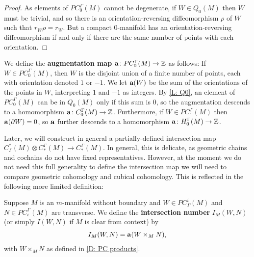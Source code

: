 \begin{proof}
	As elements of $PC_0^\Gamma(M)$ cannot be degenerate, if $W \in Q_0(M)$ then $W$ must be trivial, and so there is an orientation-reversing diffeomorphism $\rho$ of $W$ such that $r_W\rho = r_W$.
	But a compact $0$-manifold has an orientation-reversing diffeomorphism if and only if there are the same number of points with each orientation.
\end{proof}

\begin{definition}\label{D: aug}
	We define the \textbf{augmentation map} $\mathbf{a} \colon PC^\Gamma_0(M) \to \mathbb{Z}$ as follows: If $W \in PC^\Gamma_0(M)$, then $W$ is the disjoint union of a finite number of points, each with orientation denoted $1$ or $-1$.
	We let $\mathbf{a}(W)$ be the sum of the orientations of the points in $W$, interpreting $1$ and $-1$ as integers.
	By \cref{L: Q0}, an element of $PC^\Gamma_0(M)$ can be in $Q_0(M)$ only if this sum is $0$, so the augmentation descends to a homomorphism $\mathbf{a} \colon C^\Gamma_0(M) \to \mathbb{Z}$.
	Furthermore, if $W \in PC_1^\Gamma(M)$ then $\mathbf{a}(\partial W) = 0$, so $\mathbf{a}$ further descends to a homomorphism $\mathbf{a} \colon H_0^\Gamma(M) \to \mathbb{Z}$.
\end{definition}

Later, we will construct in general a partially-defined intersection map $C^*_\Gamma(M) \otimes C_*^\Gamma(M) \to C_*^\Gamma(M)$.
In general, this is delicate, as geometric chains and cochains do not have fixed representatives.
However, at the moment we do not need this full generality to define the intersection map we will need to compare geometric cohomology and cubical cohomology.
This is reflected in the following more limited definition:

\begin{definition}\label{D: intersection number}
	Suppose $M$ is an $m$-manifold without boundary and $W \in PC_\Gamma^i(M)$ and $N \in PC_{i}^\Gamma(M)$ are transverse.
	We define the \textbf{intersection number} $I_M(W,N)$ (or simply $I(W,N)$ if $M$ is clear from context) by $$I_M(W,N) = \mathbf{a}(W \times_M N),$$ with $W \times_M N$ as defined in \cref{D: PC products}.
\end{definition}

